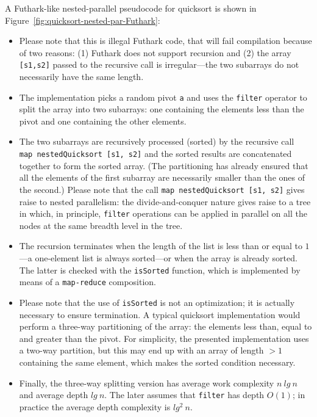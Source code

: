 \documentclass[acmsmall,review]{acmart}\settopmatter{printfolios=true,printccs=false,printacmref=false}
\begin{document}
A Futhark-like nested-parallel pseudocode for quicksort is shown in 
Figure~\ref{fig:quicksort-nested-par-Futhark}:
\begin{itemize}
    \item Please note that this is illegal Futhark code, that will
        fail compilation because of two reasons: (1) Futhark does
        not support recursion and (2) the array {\tt [s1,s2]} passed 
        to the recursive call is irregular---the two subarrays do not
        necessarily have the same length.
    \item The implementation picks a random pivot {\tt a} and uses the
        \lstinline{filter} operator to split the array into two subarrays:
        one containing the elements less than the pivot and one containing 
        the other elements.
    \item The two subarrays are recursively processed (sorted) by the recursive
        call\\ \lstinline{map nestedQuicksort [s1, s2]} and the sorted results
        are concatenated together to form the sorted array. (The partitioning
        has already ensured that all the elements of the first subarray are 
        necessarily smaller than the ones of the second.) 
        Please note that the call \lstinline{map nestedQuicksort [s1, s2]}
        gives raise to nested parallelism: the divide-and-conquer nature
        gives raise to a tree in which, in principle, \lstinline{filter}
        operations can be applied in parallel on all the nodes at the same 
        breadth level in the tree.
    \item The recursion terminates when the length of the list is less than
        or equal to $1$---a one-element list is always sorted---or when the
        array is already sorted. The latter is checked with the {\tt isSorted}
        function, which is implemented by means of a \lstinline{map-reduce}
        composition.   
    \item Please note that the use of {\tt isSorted} is not
        an optimization; it is actually necessary to ensure termination. 
        A typical quicksort implementation would perform a three-way partitioning
        of the array: the elements less than, equal to and greater than the pivot.
        For simplicity, the presented implementation uses a two-way partition,
        but this may end up with an array of length $>1$ containing the same
        element, which makes the sorted condition necessary.
    \item Finally, the three-way splitting version has average work complexity
        $n ~lg~n$ and average depth $lg~n$. The later assumes that \lstinline{filter}
        has depth $O(1)$; in practice the average depth complexity is $lg^2~n$.
\end{itemize}
\end{document}
